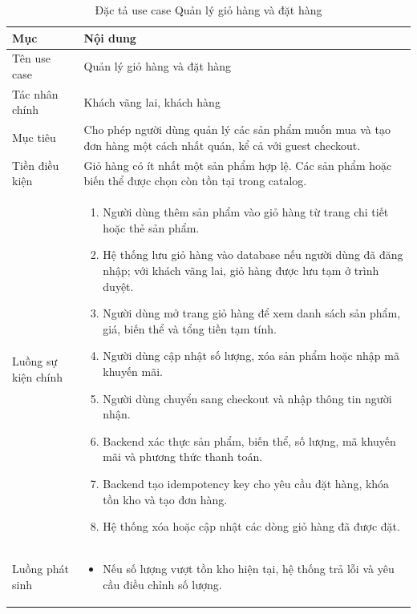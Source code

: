 \documentclass[../DoAn.tex]{subfiles}
\begin{document}
{\normalsize
\setlength{\LTleft}{\fill}
\setlength{\LTright}{\fill}
\setlength{\tabcolsep}{5pt}
\renewcommand{\arraystretch}{1.25}
\begin{longtable}{|p{3.2cm}|p{10.4cm}|}
\caption{Đặc tả use case Quản lý giỏ hàng và đặt hàng}
\label{table:2.6}\\
\hline
\textbf{Mục} & \textbf{Nội dung} \\ \hline
Tên use case & Quản lý giỏ hàng và đặt hàng \\ \hline
Tác nhân chính & Khách vãng lai, khách hàng \\ \hline
Mục tiêu & Cho phép người dùng quản lý các sản phẩm muốn mua và tạo đơn hàng một cách nhất quán, kể cả với guest checkout. \\ \hline
Tiền điều kiện & Giỏ hàng có ít nhất một sản phẩm hợp lệ. Các sản phẩm hoặc biến thể được chọn còn tồn tại trong catalog. \\ \hline
Luồng sự kiện chính &
\begin{minipage}[t]{10.1cm}
\begin{enumerate}[leftmargin=*,topsep=0pt,itemsep=0pt]
    \item Người dùng thêm sản phẩm vào giỏ hàng từ trang chi tiết hoặc thẻ sản phẩm.
    \item Hệ thống lưu giỏ hàng vào database nếu người dùng đã đăng nhập; với khách vãng lai, giỏ hàng được lưu tạm ở trình duyệt.
    \item Người dùng mở trang giỏ hàng để xem danh sách sản phẩm, giá, biến thể và tổng tiền tạm tính.
    \item Người dùng cập nhật số lượng, xóa sản phẩm hoặc nhập mã khuyến mãi.
    \item Người dùng chuyển sang checkout và nhập thông tin người nhận.
    \item Backend xác thực sản phẩm, biến thể, số lượng, mã khuyến mãi và phương thức thanh toán.
    \item Backend tạo idempotency key cho yêu cầu đặt hàng, khóa tồn kho và tạo đơn hàng.
    \item Hệ thống xóa hoặc cập nhật các dòng giỏ hàng đã được đặt.
\end{enumerate}
\end{minipage} \\ \hline
Luồng phát sinh &
\begin{minipage}[t]{10.1cm}
\begin{itemize}[leftmargin=*,topsep=0pt,itemsep=0pt]
    \item Nếu số lượng vượt tồn kho hiện tại, hệ thống trả lỗi và yêu cầu điều chỉnh số lượng.

\end{itemize}
\end{minipage}
\end{longtable}}
\end{document}
